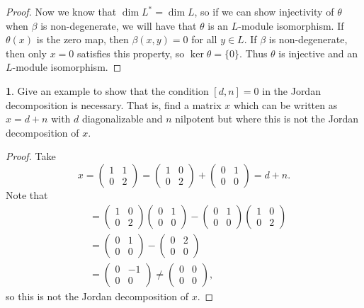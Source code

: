 \documentclass[12pt]{article}
\theoremstyle{definition}
\newtheorem{ex}{}
\begin{document}
\begin{proof}
  Now we know that $\dim L^* = \dim L$, so if we can show injectivity of $\theta$ when $\beta$ is non-degenerate, we will have that $\theta$ is an $L$-module isomorphism.
  If $\theta(x)$ is the zero map, then $\beta(x, y) = 0$ for all $y \in L$.
  If $\beta$ is non-degenerate, then only $x = 0$ satisfies this property, so $\ker\theta = \lbrace 0 \rbrace$.
  Thus $\theta$ is injective and an $L$-module isomorphism.
\end{proof}

\begin{ex}
	Give an example to show that the condition $[d, n] = 0$ in the Jordan decomposition is necessary.
	That is, find a matrix $x$ which can be written as $x = d + n$ with $d$ diagonalizable and $n$ nilpotent but where this is not the Jordan decomposition of $x$.
\end{ex}
\begin{proof}
  Take \begin{equation*}
    x = \begin{pmatrix}1 & 1 \\ 0 & 2\end{pmatrix} = \begin{pmatrix}1 & 0 \\ 0 & 2\end{pmatrix} + \begin{pmatrix}0 & 1 \\ 0 & 0\end{pmatrix} = d + n.
  \end{equation*}
  Note that \begin{align*}
    [d, n] & = \begin{pmatrix}1 & 0 \\ 0 & 2\end{pmatrix} \begin{pmatrix}0 & 1 \\ 0 & 0\end{pmatrix} - \begin{pmatrix}0 & 1 \\ 0 & 0\end{pmatrix} \begin{pmatrix}1 & 0 \\ 0 & 2\end{pmatrix} \\
           & = \begin{pmatrix}0 & 1 \\ 0 & 0\end{pmatrix} - \begin{pmatrix}0 & 2 \\ 0 & 0\end{pmatrix} \\
             & = \begin{pmatrix}0 & -1 \\ 0 & 0\end{pmatrix} \neq \begin{pmatrix}0 & 0 \\ 0 & 0\end{pmatrix},
  \end{align*}
  so this is not the Jordan decomposition of $x$.
\end{proof}
\end{document}
